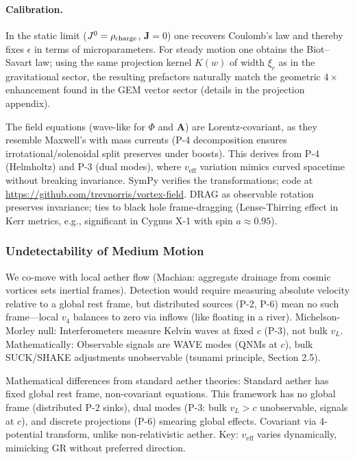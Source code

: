 \paragraph{Calibration.} In the static limit ($J^0=\rho_{\rm charge}$, $\mathbf J=0$) one recovers Coulomb's law and thereby fixes $\epsilon$ in terms of microparameters. For steady motion one obtains the Biot--Savart law; using the same projection kernel $K(w)$ of width $\xi_c$ as in the gravitational sector, the resulting prefactors naturally match the geometric $4\times$ enhancement found in the GEM vector sector (details in the projection appendix).


The field equations (wave-like for $\Phi$ and $\mathbf{A}$) are Lorentz-covariant, as they resemble Maxwell's with mass currents (P-4 decomposition ensures irrotational/solenoidal split preserves under boosts). This derives from P-4 (Helmholtz) and P-3 (dual modes), where $v_{\text{eff}}$ variation mimics curved spacetime without breaking invariance. SymPy verifies the transformations; code at \url{https://github.com/trevnorris/vortex-field}. DRAG as observable rotation preserves invariance; ties to black hole frame-dragging (Lense-Thirring effect in Kerr metrics, e.g., significant in Cygnus X-1 with spin $a \approx 0.95$).

\subsubsection{Undetectability of Medium Motion}

We co-move with local aether flow (Machian: aggregate drainage from cosmic vortices sets inertial frames). Detection would require measuring absolute velocity relative to a global rest frame, but distributed sources (P-2, P-6) mean no such frame---local $v_4$ balances to zero via inflows (like floating in a river). Michelson-Morley null: Interferometers measure Kelvin waves at fixed $c$ (P-3), not bulk $v_L$. Mathematically: Observable signals are WAVE modes (QNMs at $c$), bulk SUCK/SHAKE adjustments unobservable (tsunami principle, Section 2.5).

Mathematical differences from standard aether theories: Standard aether has fixed global rest frame, non-covariant equations. This framework has no global frame (distributed P-2 sinks), dual modes (P-3: bulk $v_L > c$ unobservable, signals at $c$), and discrete projections (P-6) smearing global effects. Covariant via 4-potential transform, unlike non-relativistic aether. Key: $v_{\text{eff}}$ varies dynamically, mimicking GR without preferred direction.

